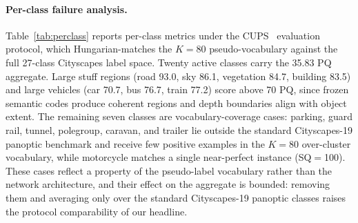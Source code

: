 \documentclass{article}
\begin{document}
\paragraph{Per-class failure analysis.}
\begin{table}[tbp]
\caption{Per-class Cityscapes validation metrics for the final trained network used in Table~\ref{tab:main}. Values are percentages. Six classes (parking, guard rail, tunnel, polegroup, caravan, trailer) are vocabulary-dead; the twenty active classes carry the 35.83 PQ aggregate.}
\label{tab:perclass}
\centering
\small
\setlength{\tabcolsep}{6pt}
\end{table}
Table~\ref{tab:perclass} reports per-class metrics under the CUPS~\cite{hahn2025cups} evaluation protocol, which Hungarian-matches the $K=80$ pseudo-vocabulary against the full 27-class Cityscapes label space. Twenty active classes carry the 35.83 PQ aggregate. Large stuff regions (road 93.0, sky 86.1, vegetation 84.7, building 83.5) and large vehicles (car 70.7, bus 76.7, train 77.2) score above 70 PQ, since frozen semantic codes produce coherent regions and depth boundaries align with object extent. The remaining seven classes are vocabulary-coverage cases: parking, guard rail, tunnel, polegroup, caravan, and trailer lie outside the standard Cityscapes-19 panoptic benchmark and receive few positive examples in the $K=80$ over-cluster vocabulary, while motorcycle matches a single near-perfect instance (SQ$=$100). These cases reflect a property of the pseudo-label vocabulary rather than the network architecture, and their effect on the aggregate is bounded: removing them and averaging only over the standard Cityscapes-19 panoptic classes raises the protocol comparability of our headline.
\end{document}
